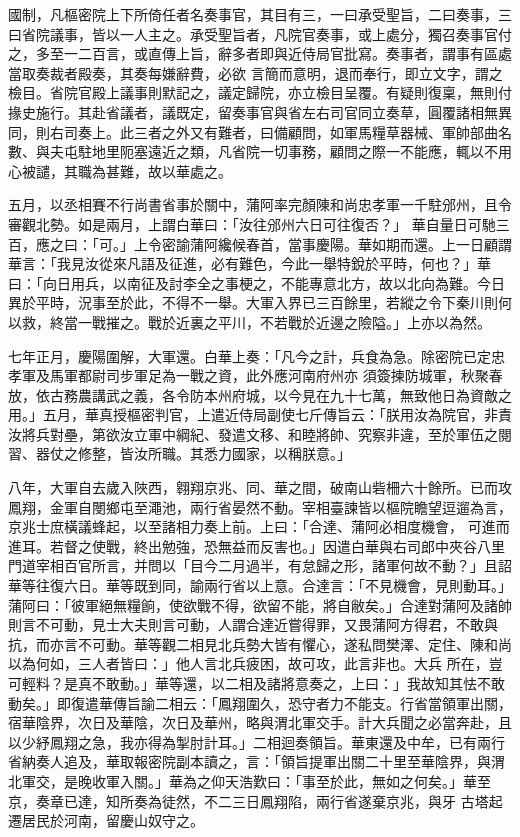 \begin{pinyinscope}
 國制，凡樞密院上下所倚任者名奏事官，其目有三，一曰承受聖旨，二曰奏事，三曰省院議事，皆以一人主之。承受聖旨者，凡院官奏事，或上處分，獨召奏事官付之，多至一二百言，或直傳上旨，辭多者即與近侍局官批寫。奏事者，謂事有區處當取奏裁者殿奏，其奏每嫌辭費，必欲
 言簡而意明，退而奉行，即立文字，謂之檢目。省院官殿上議事則默記之，議定歸院，亦立檢目呈覆。有疑則復稟，無則付掾史施行。其赴省議者，議既定，留奏事官與省左右司官同立奏草，圓覆諸相無異同，則右司奏上。此三者之外又有難者，曰備顧問，如軍馬糧草器械、軍帥部曲名數、與夫屯駐地里阨塞遠近之類，凡省院一切事務，顧問之際一不能應，輒以不用心被譴，其職為甚難，故以華處之。



 五月，以丞相賽不行尚書省事於關中，蒲阿率完顏陳和尚忠孝軍一千駐邠州，且令審觀北勢。如是兩月，上謂白華曰：「汝往邠州六日可往復否？」
 華自量日可馳三百，應之曰：「可。」上令密諭蒲阿纔候春首，當事慶陽。華如期而還。上一日顧謂華言：「我見汝從來凡語及征進，必有難色，今此一舉特銳於平時，何也？」華曰：「向日用兵，以南征及討李全之事梗之，不能專意北方，故以北向為難。今日異於平時，況事至於此，不得不一舉。大軍入界已三百餘里，若縱之令下秦川則何以救，終當一戰摧之。戰於近裏之平川，不若戰於近邊之險隘。」上亦以為然。



 七年正月，慶陽圍解，大軍還。白華上奏：「凡今之計，兵食為急。除密院已定忠孝軍及馬軍都尉司步軍足為一戰之資，此外應河南府州亦
 須簽揀防城軍，秋聚春放，依古務農講武之義，各令防本州府城，以今見在九十七萬，無致他日為資敵之用。」五月，華真授樞密判官，上遣近侍局副使七斤傳旨云：「朕用汝為院官，非責汝將兵對壘，第欲汝立軍中綱紀、發遣文移、和睦將帥、究察非違，至於軍伍之閱習、器仗之修整，皆汝所職。其悉力國家，以稱朕意。」



 八年，大軍自去歲入陜西，翱翔京兆、同、華之間，破南山砦柵六十餘所。已而攻鳳翔，金軍自閿鄉屯至澠池，兩行省晏然不動。宰相臺諫皆以樞院瞻望逗遛為言，京兆士庶橫議蜂起，以至諸相力奏上前。上曰：「合達、蒲阿必相度機會，
 可進而進耳。若督之使戰，終出勉強，恐無益而反害也。」因遣白華與右司郎中夾谷八里門道宰相百官所言，并問以「目今二月過半，有怠歸之形，諸軍何故不動？」且詔華等往復六日。華等既到同，諭兩行省以上意。合達言：「不見機會，見則動耳。」蒲阿曰：「彼軍絕無糧餉，使欲戰不得，欲留不能，將自敝矣。」合達對蒲阿及諸帥則言不可動，見士大夫則言可動，人謂合達近嘗得罪，又畏蒲阿方得君，不敢與抗，而亦言不可動。華等觀二相見北兵勢大皆有懼心，遂私問樊澤、定住、陳和尚以為何如，三人者皆曰：」他人言北兵疲困，故可攻，此言非也。大兵
 所在，豈可輕料？是真不敢動。」華等還，以二相及諸將意奏之，上曰：」我故知其怯不敢動矣。」即復遣華傳旨諭二相云：「鳳翔圍久，恐守者力不能支。行省當領軍出關，宿華陰界，次日及華陰，次日及華州，略與渭北軍交手。計大兵聞之必當奔赴，且以少紓鳳翔之急，我亦得為掣肘計耳。」二相迴奏領旨。華東還及中牟，已有兩行省納奏人追及，華取報密院副本讀之，言：「領旨提軍出關二十里至華陰界，與渭北軍交，是晚收軍入關。」華為之仰天浩歎曰：「事至於此，無如之何矣。」華至京，奏章已達，知所奏為徒然，不二三日鳳翔陷，兩行省遂棄京兆，與牙
 古塔起遷居民於河南，留慶山奴守之。




\end{pinyinscope}
